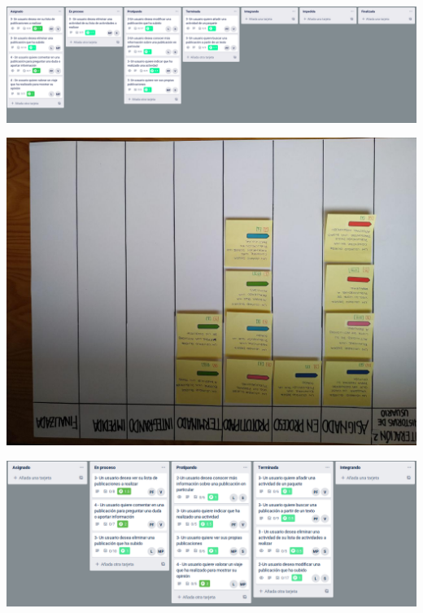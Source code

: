 \documentclass[spanish]{beamer}
\begin{document}
\begin{frame}
	\begin{center}
		\includegraphics[scale=0.24]{trello2_5}
	\end{center}
\end{frame}

\begin{frame}
	\begin{center}
		\includegraphics[angle=180, scale=0.32]{papel2_4}
	\end{center}
\end{frame}

\begin{frame}
	\begin{center}
		\includegraphics[scale=0.25]{trello2_6}
	\end{center}
\end{frame}
\end{document}
